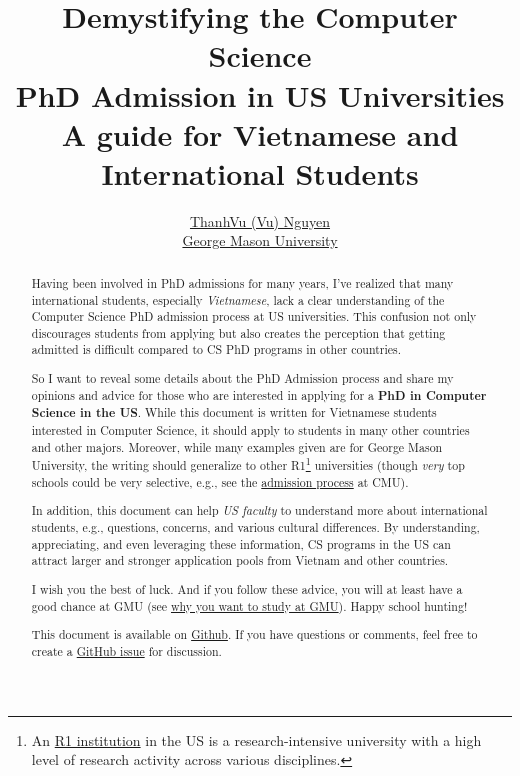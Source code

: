 \documentclass[11pt]{article}
\title{Demystifying the Computer Science \\PhD Admission in US Universities\\{\large A guide for Vietnamese and International Students}}
\author{\small \href{https://nguyenthanhvuh.github.io}{ThanhVu (Vu) Nguyen}\\
\href{https://cs.gmu.edu}{George Mason University}}
\begin{document}
\maketitle

\begin{abstract}
Having been involved in PhD admissions for many years, I've
realized that many international students, especially \emph{Vietnamese}, lack a clear understanding of
the Computer Science PhD admission process at US universities. This confusion not only
discourages students from applying but also creates the perception that
getting admitted is difficult compared to CS PhD programs in other countries.

So I want to reveal some details about the PhD Admission process and share my opinions and advice for those who are interested in applying for a \textbf{PhD in Computer Science in the US}.
While this document is written for Vietnamese students interested in Computer Science, it should apply to students in many other countries and other majors.
Moreover, while many examples given are for George Mason University, the writing should generalize to other R1\footnote{An \href{https://en.wikipedia.org/wiki/List_of_research_universities_in_the_United_States}{R1 institution} in the US is a research-intensive university with a high level of research activity across various disciplines.} universities  (though \emph{very} top schools could be very selective, e.g., see the \href{https://da-data.blogspot.com/2015/03/reflecting-on-cs-graduate-admissions.html}{admission process} at CMU).

In addition, this document can help \emph{US faculty} to understand more about international students, e.g., questions, concerns, and various cultural differences.  By understanding, appreciating, and even leveraging these information, CS programs in the US can attract larger and stronger application pools from Vietnam and other countries.

I wish you the best of luck. And if you follow these advice,
you will at least have a good chance at GMU (see
\href{https://github.com/dynaroars/dynaroars.github.io/wiki/About-GMU}{why
you want to study at GMU}). Happy school hunting!

This document is available on \href{https://github.com/nguyenthanhvuh/phd-cs-us}{Github}. If you have questions or comments, feel free to create a \href{https://github.com/nguyenthanhvuh/phd-cs-us/issues}{GitHub issue} for discussion.
\end{abstract}
\end{document}
